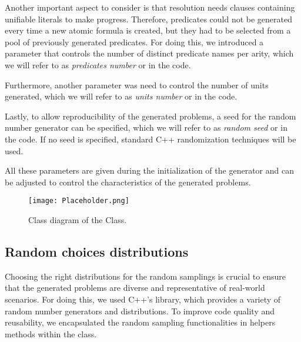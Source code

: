 Another important aspect to consider is that resolution needs clauses containing unifiable literals to make progress. Therefore, predicates could not be generated every time a new atomic formula is created, but they had to be selected from a pool of previously generated predicates.
For doing this, we introduced a parameter that controls the number of distinct predicate names per arity, which we will refer to as \emph{predicates number} or  in the code.

Furthermore, another parameter was need to control the number of units generated, which we will refer to as \emph{units number} or  in the code.

Lastly, to allow reproducibility of the generated problems, a seed for the random number generator can be specified, which we will refer to as \emph{random seed} or  in the code.
If no seed is specified, standard C++ randomization techniques will be used.

All these parameters are given during the initialization of the generator and can be adjusted to control the characteristics of the generated problems.

\begin{figure}[H]
  \centering
  \texttt{[image: Placeholder.png]}
  \caption{Class diagram of the  Class.}\label{fig:fluted-generator-architecture}
\end{figure}

\subsection{Random choices distributions}\label{subsec:random-choices-distributions}

Choosing the right distributions for the random samplings is crucial to ensure that the generated problems are diverse and representative of real-world scenarios.
For doing this, we used C++'s  library, which provides a variety of random number generators and distributions.
To improve code quality and reusability, we encapsulated the random sampling functionalities in helpers methods within the  class.

